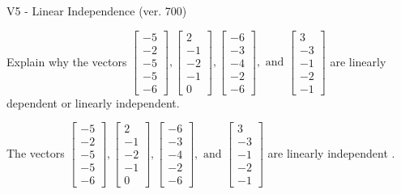 \begin{exercise}
  \begin{exerciseTitle}V5 - Linear Independence (ver. 700)\end{exerciseTitle}
  \begin{exerciseStatement}
    Explain why the vectors \(\left[\begin{array}{r}
-5 \\
-2 \\
-5 \\
-5 \\
-6
\end{array}\right] , \left[\begin{array}{r}
2 \\
-1 \\
-2 \\
-1 \\
0
\end{array}\right] , \left[\begin{array}{r}
-6 \\
-3 \\
-4 \\
-2 \\
-6
\end{array}\right] , \text{ and } \left[\begin{array}{r}
3 \\
-3 \\
-1 \\
-2 \\
-1
\end{array}\right]\) are linearly dependent or linearly independent.	


  \end{exerciseStatement}
  \begin{exerciseAnswer}
   The vectors \(\left[\begin{array}{r}
-5 \\
-2 \\
-5 \\
-5 \\
-6
\end{array}\right] , \left[\begin{array}{r}
2 \\
-1 \\
-2 \\
-1 \\
0
\end{array}\right] , \left[\begin{array}{r}
-6 \\
-3 \\
-4 \\
-2 \\
-6
\end{array}\right] , \text{ and } \left[\begin{array}{r}
3 \\
-3 \\
-1 \\
-2 \\
-1
\end{array}\right]\) are 
  	 linearly independent  .
  


  \end{exerciseAnswer}
\end{exercise}